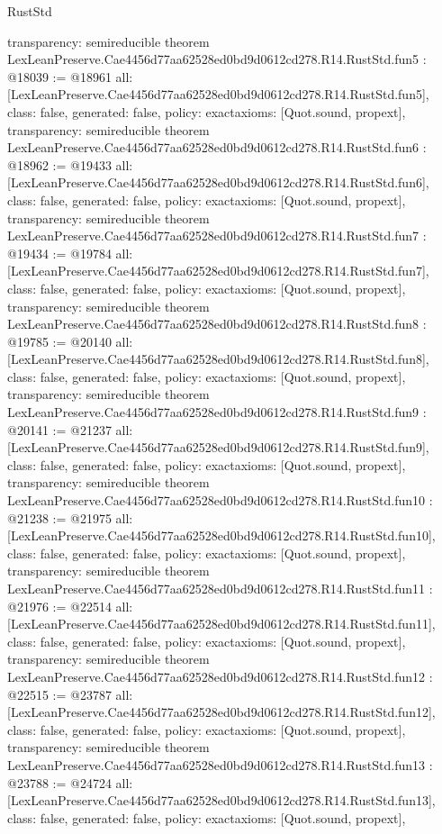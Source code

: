 \begin{lexlean}{RustStd}
\begin{coremodule}
{  transparency: semireducible
}
theorem LexLeanPreserve.Cae4456d77aa62528ed0bd9d0612cd278.R14.RustStd.fun5 : @18039 := @18961 {
  all: [LexLeanPreserve.Cae4456d77aa62528ed0bd9d0612cd278.R14.RustStd.fun5],
  class: false,
  generated: false,
  policy: exact{axioms: [Quot.sound, propext]},
  transparency: semireducible
}
theorem LexLeanPreserve.Cae4456d77aa62528ed0bd9d0612cd278.R14.RustStd.fun6 : @18962 := @19433 {
  all: [LexLeanPreserve.Cae4456d77aa62528ed0bd9d0612cd278.R14.RustStd.fun6],
  class: false,
  generated: false,
  policy: exact{axioms: [Quot.sound, propext]},
  transparency: semireducible
}
theorem LexLeanPreserve.Cae4456d77aa62528ed0bd9d0612cd278.R14.RustStd.fun7 : @19434 := @19784 {
  all: [LexLeanPreserve.Cae4456d77aa62528ed0bd9d0612cd278.R14.RustStd.fun7],
  class: false,
  generated: false,
  policy: exact{axioms: [Quot.sound, propext]},
  transparency: semireducible
}
theorem LexLeanPreserve.Cae4456d77aa62528ed0bd9d0612cd278.R14.RustStd.fun8 : @19785 := @20140 {
  all: [LexLeanPreserve.Cae4456d77aa62528ed0bd9d0612cd278.R14.RustStd.fun8],
  class: false,
  generated: false,
  policy: exact{axioms: [Quot.sound, propext]},
  transparency: semireducible
}
theorem LexLeanPreserve.Cae4456d77aa62528ed0bd9d0612cd278.R14.RustStd.fun9 : @20141 := @21237 {
  all: [LexLeanPreserve.Cae4456d77aa62528ed0bd9d0612cd278.R14.RustStd.fun9],
  class: false,
  generated: false,
  policy: exact{axioms: [Quot.sound, propext]},
  transparency: semireducible
}
theorem LexLeanPreserve.Cae4456d77aa62528ed0bd9d0612cd278.R14.RustStd.fun10 : @21238 := @21975 {
  all: [LexLeanPreserve.Cae4456d77aa62528ed0bd9d0612cd278.R14.RustStd.fun10],
  class: false,
  generated: false,
  policy: exact{axioms: [Quot.sound, propext]},
  transparency: semireducible
}
theorem LexLeanPreserve.Cae4456d77aa62528ed0bd9d0612cd278.R14.RustStd.fun11 : @21976 := @22514 {
  all: [LexLeanPreserve.Cae4456d77aa62528ed0bd9d0612cd278.R14.RustStd.fun11],
  class: false,
  generated: false,
  policy: exact{axioms: [Quot.sound, propext]},
  transparency: semireducible
}
theorem LexLeanPreserve.Cae4456d77aa62528ed0bd9d0612cd278.R14.RustStd.fun12 : @22515 := @23787 {
  all: [LexLeanPreserve.Cae4456d77aa62528ed0bd9d0612cd278.R14.RustStd.fun12],
  class: false,
  generated: false,
  policy: exact{axioms: [Quot.sound, propext]},
  transparency: semireducible
}
theorem LexLeanPreserve.Cae4456d77aa62528ed0bd9d0612cd278.R14.RustStd.fun13 : @23788 := @24724 {
  all: [LexLeanPreserve.Cae4456d77aa62528ed0bd9d0612cd278.R14.RustStd.fun13],
  class: false,
  generated: false,
  policy: exact{axioms: [Quot.sound, propext]},
}
\end{coremodule}
\end{lexlean}
